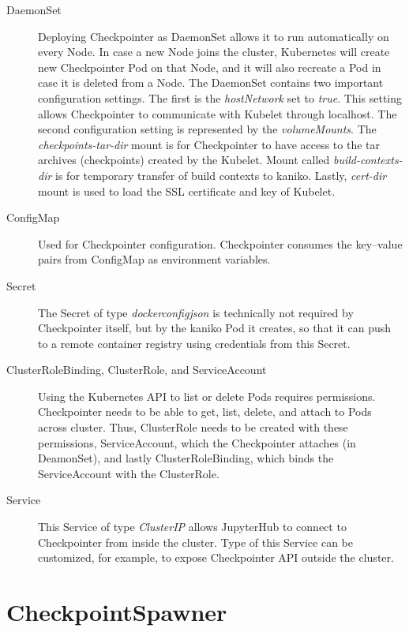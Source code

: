 \documentclass[
  digital,     %
  oneside,     %
  nosansbold,  %
  nocolorbold, %
  lof,         %
  lot,         %
]{fithesis4}
\begin{document}
\begin{description}
    
    \item[DaemonSet] Deploying Checkpointer as DaemonSet allows it to run automatically on every Node. In case a new Node joins the cluster, Kubernetes will create new Checkpointer Pod on that Node, and it will also recreate a Pod in case it is deleted from a Node. The DaemonSet contains two important configuration settings. The first is the \emph{hostNetwork} set to \emph{true}. This setting allows Checkpointer to communicate with Kubelet through localhost. The second configuration setting is represented by the \emph{volumeMounts}. The 
    \emph{checkpoints-tar-dir} mount is for Checkpointer to have access to the tar archives (checkpoints) created by the Kubelet. Mount called \emph{build-contexts-dir} is for temporary transfer of build contexts to kaniko. Lastly, \emph{cert-dir} mount is used to load the SSL certificate and key of Kubelet.
    
    \item[ConfigMap] Used for Checkpointer configuration. Checkpointer consumes the key--value pairs from ConfigMap as environment variables.    
    
    \item[Secret] The Secret of type \emph{dockerconfigjson} is technically not required by Checkpointer itself, but by the kaniko Pod it creates, so that it can push to a remote container registry using credentials from this Secret.
    
    \item[ClusterRoleBinding, ClusterRole, and ServiceAccount]
    Using the Kubernetes API to list or delete Pods requires permissions. Checkpointer needs to be able to get, list, delete, and attach to Pods across cluster. Thus, ClusterRole needs to be created with these permissions, ServiceAccount, which the Checkpointer attaches (in DeamonSet), and lastly ClusterRoleBinding, which binds the ServiceAccount with the ClusterRole.
    
    \item[Service] This Service of type \emph{ClusterIP} allows JupyterHub to connect to Checkpointer from inside the cluster. Type of this Service can be customized, for example, to expose Checkpointer API outside the cluster.

\end{description}



\chapter{CheckpointSpawner}
\label{chap:checkpoint_spawner}
\end{document}
